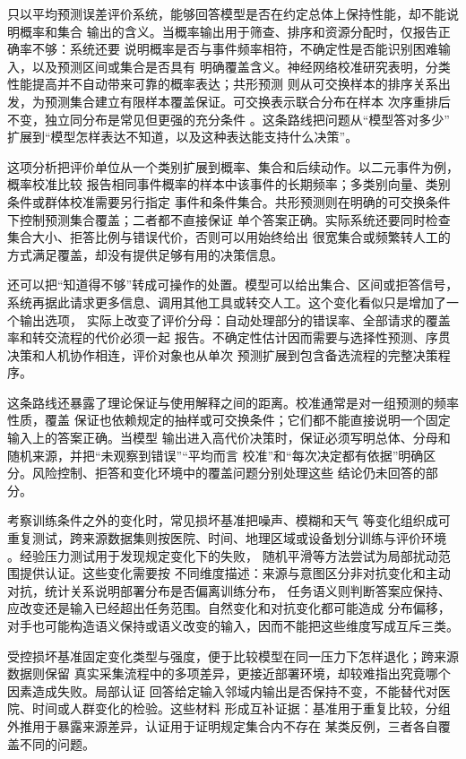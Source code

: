 只以平均预测误差评价系统，能够回答模型是否在约定总体上保持性能，却不能说明概率和集合
输出的含义。当概率输出用于筛查、排序和资源分配时，仅报告正确率不够：系统还要
说明概率是否与事件频率相符，不确定性是否能识别困难输入，以及预测区间或集合是否具有
明确覆盖含义。神经网络校准研究表明，分类性能提高并不自动带来可靠的概率表达；共形预测
则从可交换样本的排序关系出发，为预测集合建立有限样本覆盖保证。可交换表示联合分布在样本
次序重排后不变，独立同分布是常见但更强的充分条件
。这条路线把问题从“模型答对多少”
扩展到“模型怎样表达不知道，以及这种表达能支持什么决策”。

这项分析把评价单位从一个类别扩展到概率、集合和后续动作。以二元事件为例，概率校准比较
报告相同事件概率的样本中该事件的长期频率；多类别向量、类别条件或群体校准需要另行指定
事件和条件集合。共形预测则在明确的可交换条件下控制预测集合覆盖；二者都不直接保证
单个答案正确。实际系统还要同时检查集合大小、拒答比例与错误代价，否则可以用始终给出
很宽集合或频繁转人工的方式满足覆盖，却没有提供足够有用的决策信息。

还可以把“知道得不够”转成可操作的处置。模型可以给出集合、区间或拒答信号，
系统再据此请求更多信息、调用其他工具或转交人工。这个变化看似只是增加了一个输出选项，
实际上改变了评价分母：自动处理部分的错误率、全部请求的覆盖率和转交流程的代价必须一起
报告。不确定性估计因而需要与选择性预测、序贯决策和人机协作相连，评价对象也从单次
预测扩展到包含备选流程的完整决策程序。

这条路线还暴露了理论保证与使用解释之间的距离。校准通常是对一组预测的频率性质，覆盖
保证也依赖规定的抽样或可交换条件；它们都不能直接说明一个固定输入上的答案正确。当模型
输出进入高代价决策时，保证必须写明总体、分母和随机来源，并把“未观察到错误”“平均而言
校准”和“每次决定都有依据”明确区分。风险控制、拒答和变化环境中的覆盖问题分别处理这些
结论仍未回答的部分。

考察训练条件之外的变化时，常见损坏基准把噪声、模糊和天气
等变化组织成可重复测试，跨来源数据集则按医院、时间、地理区域或设备划分训练与评价环境
。经验压力测试用于发现规定变化下的失败，
随机平滑等方法尝试为局部扰动范围提供认证。这些变化需要按
不同维度描述：来源与意图区分非对抗变化和主动对抗，统计关系说明部署分布是否偏离训练分布，
任务语义则判断答案应保持、应改变还是输入已经超出任务范围。自然变化和对抗变化都可能造成
分布偏移，对手也可能构造语义保持或语义改变的输入，因而不能把这些维度写成互斥三类。

受控损坏基准固定变化类型与强度，便于比较模型在同一压力下怎样退化；跨来源数据则保留
真实采集流程中的多项差异，更接近部署环境，却较难指出究竟哪个因素造成失败。局部认证
回答给定输入邻域内输出是否保持不变，不能替代对医院、时间或人群变化的检验。这些材料
形成互补证据：基准用于重复比较，分组外推用于暴露来源差异，认证用于证明规定集合内不存在
某类反例，三者各自覆盖不同的问题。

